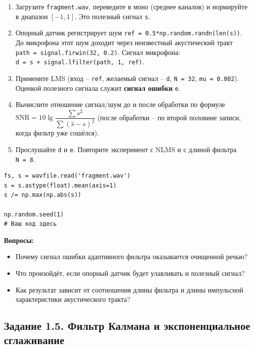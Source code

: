 \documentclass[12pt,a4paper,openany]{book}
\providecommand{\tightlist}{\setlength{\itemsep}{0pt}\setlength{\parskip}{0pt}}
\begin{document}
\begin{enumerate}
\def\labelenumi{\arabic{enumi}.}
\tightlist
\item
  Загрузите \texttt{fragment.\allowbreak{}wav}, переведите в моно (среднее каналов) и нормируйте в диапазон \([-1, 1]\). Это полезный сигнал \texttt{s}.
\item
  Опорный датчик регистрирует шум \texttt{ref\ =\allowbreak{}\ 0.\allowbreak{}5*np.\allowbreak{}random.\allowbreak{}randn(\allowbreak{}len(\allowbreak{}s))}. До микрофона этот шум доходит через неизвестный акустический тракт \texttt{path\ =\allowbreak{}\ signal.\allowbreak{}firwin(\allowbreak{}32,\allowbreak{}\ 0.\allowbreak{}2)}. Сигнал микрофона: \texttt{d\ =\allowbreak{}\ s\ +\ signal.\allowbreak{}lfilter(\allowbreak{}path,\allowbreak{}\ 1,\allowbreak{}\ ref)}.
\item
  Примените LMS (вход -- \texttt{ref}, желаемый сигнал -- \texttt{d}, \texttt{N\ =\allowbreak{}\ 32}, \texttt{mu\ =\allowbreak{}\ 0.\allowbreak{}002}). Оценкой полезного сигнала служит \textbf{сигнал ошибки} \texttt{e}.
\item
  Вычислите отношение сигнал/шум до и после обработки по формуле \(\mathrm{SNR} = 10\lg\dfrac{\sum s^2}{\sum (\hat s - s)^2}\) (после обработки -- по второй половине записи, когда фильтр уже сошёлся).
\item
  Прослушайте \texttt{d} и \texttt{e}. Повторите эксперимент с NLMS и с длиной фильтра \texttt{N\ =\allowbreak{}\ 8}.
\end{enumerate}

\begin{Verbatim}[fontsize=\small, breaklines, breakanywhere, frame=single, framesep=2mm]
fs, s = wavfile.read('fragment.wav')
s = s.astype(float).mean(axis=1)
s /= np.max(np.abs(s))

np.random.seed(1)
# Ваш код здесь
\end{Verbatim}

\textbf{Вопросы:}

\begin{itemize}
\tightlist
\item
  Почему сигнал ошибки адаптивного фильтра оказывается очищенной речью?
\item
  Что произойдёт, если опорный датчик будет улавливать и полезный сигнал?
\item
  Как результат зависит от соотношения длины фильтра и длины импульсной характеристики акустического тракта?
\end{itemize}

\subsection*{Задание 1.5. Фильтр Калмана и экспоненциальное сглаживание}
\end{document}

